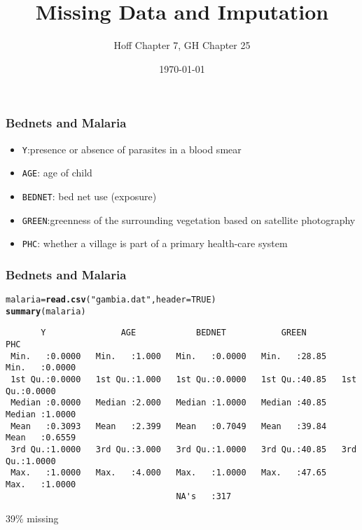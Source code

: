 \documentclass[]{beamer}\usepackage[]{graphicx}\usepackage[]{color}
\title{Missing Data and Imputation}
\author{Hoff Chapter 7, GH Chapter 25}
\date{\today}
\makeatletter
\newcommand{\hlnum}[1]{\textcolor[rgb]{0.686,0.059,0.569}{#1}}%
\newcommand{\hlstr}[1]{\textcolor[rgb]{0.192,0.494,0.8}{#1}}%
\newcommand{\hlstd}[1]{\textcolor[rgb]{0.345,0.345,0.345}{#1}}%
\newcommand{\hlkwb}[1]{\textcolor[rgb]{0.69,0.353,0.396}{#1}}%
\newcommand{\hlkwc}[1]{\textcolor[rgb]{0.333,0.667,0.333}{#1}}%
\newcommand{\hlkwd}[1]{\textcolor[rgb]{0.737,0.353,0.396}{\textbf{#1}}}%
\newenvironment{kframe}{%
 \def\at@end@of@kframe{}%
 \ifinner\ifhmode%
  \def\at@end@of@kframe{\end{minipage}}%
  \begin{minipage}{\columnwidth}%
 \fi\fi%
 \def\FrameCommand##1{\hskip\@totalleftmargin \hskip-\fboxsep
 \colorbox{shadecolor}{##1}\hskip-\fboxsep
     \hskip-\linewidth \hskip-\@totalleftmargin \hskip\columnwidth}%
 \MakeFramed {\advance\hsize-\width
   \@totalleftmargin\z@ \linewidth\hsize
   \@setminipage}}%
 {\par\unskip\endMakeFramed%
 \at@end@of@kframe}
\newenvironment{knitrout}{}{} %
\makeatother
\begin{document}
\maketitle


\begin{frame}[fragile]\frametitle{Bednets and Malaria}

\begin{itemize} %
\item {\tt Y}:presence or absence of parasites in a blood smear
\item {\tt AGE}: age of child
\item {\tt BEDNET}: bed net use  (exposure)
\item {\tt GREEN}:greenness of the surrounding vegetation based on satellite photography
\item {\tt PHC}: whether a village is part of a primary health-care system
\end{itemize}
\end{frame}

\begin{frame}[fragile]\frametitle{Bednets and Malaria}
\begin{small}
\begin{knitrout}\footnotesize
{}\color{fgcolor}\begin{kframe}
\begin{alltt}
\hlstd{malaria} \hlkwb{=} \hlkwd{read.csv}\hlstd{(}\hlstr{"gambia.dat"}\hlstd{,} \hlkwc{header}\hlstd{=}\hlnum{TRUE}\hlstd{)}
\hlkwd{summary}\hlstd{(malaria)}
\end{alltt}
\begin{verbatim}
       Y               AGE            BEDNET           GREEN            PHC        
 Min.   :0.0000   Min.   :1.000   Min.   :0.0000   Min.   :28.85   Min.   :0.0000  
 1st Qu.:0.0000   1st Qu.:1.000   1st Qu.:0.0000   1st Qu.:40.85   1st Qu.:0.0000  
 Median :0.0000   Median :2.000   Median :1.0000   Median :40.85   Median :1.0000  
 Mean   :0.3093   Mean   :2.399   Mean   :0.7049   Mean   :39.84   Mean   :0.6559  
 3rd Qu.:1.0000   3rd Qu.:3.000   3rd Qu.:1.0000   3rd Qu.:40.85   3rd Qu.:1.0000  
 Max.   :1.0000   Max.   :4.000   Max.   :1.0000   Max.   :47.65   Max.   :1.0000  
                                  NA's   :317                                      
\end{verbatim}
\end{kframe}
\end{knitrout}
\end{small}

39\% missing
\end{frame}
\end{document}
